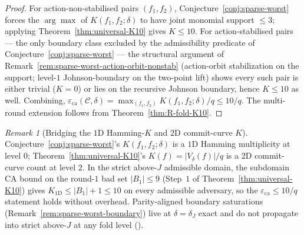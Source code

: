 \documentclass[11pt]{article}
\theoremstyle{definition}
\theoremstyle{remark}
\newtheorem{remark}[theorem]{Remark}
\begin{document}
\begin{proof}
For action-non-stabilised pairs $(f_1, f_2)$,
Conjecture~\ref{conj:sparse-worst} forces the $\arg\max$ of
$K(f_1, f_2; \delta)$ to have joint monomial support $\leq 3$;
applying Theorem~\ref{thm:universal-K10} gives $K \leq 10$.
For action-stabilised pairs --- the only boundary class excluded by
the admissibility predicate of Conjecture~\ref{conj:sparse-worst}
--- the structural argument of
Remark~\ref{rem:sparse-worst-action-orbit-nonstab}
(action-orbit stabilization on the support; level-$1$
Johnson-boundary on the two-point lift) shows every such pair is either trivial
($K = 0$) or lies on the recursive Johnson boundary, hence
$K \leq 10$ as well. Combining,
$\varepsilon_{\mathrm{ca}}(\mathcal{C}, \delta) =
\max_{(f_1, f_2)} K(f_1, f_2; \delta) / q \leq 10/q$.
The multi-round extension follows from
Theorem~\ref{thm:R-fold-K10}.
\end{proof}

\begin{remark}[Bridging the $1$D Hamming-$K$ and $2$D commit-curve $K$]
\label{rem:K10-bridge-1D-2D}
Conjecture~\ref{conj:sparse-worst}'s $K(f_1, f_2; \delta)$ is a
$1$D Hamming multiplicity at level $0$;
Theorem~\ref{thm:universal-K10}'s $K(f) = |V_\delta(f)|/q$ is a
$2$D commit-curve count at level $2$. In the strict above-$J$
admissible domain, the subdomain CA bound on the round-$1$ bad set
$|B_1| \leq 9$ (Step~$1$ of Theorem~\ref{thm:universal-K10}) gives
$K_{\text{1D}} \leq |B_1| + 1 \leq 10$ on every admissible adversary,
so the $\varepsilon_{\mathrm{ca}} \leq 10/q$ statement holds without
overhead. Parity-aligned boundary saturations
(Remark~\ref{rem:sparse-worst-boundary}) live at $\delta = \delta_J$
exact and do not propagate into strict above-$J$ at any fold level
(\cite{CompanionRepo}).
\end{remark}
\end{document}
